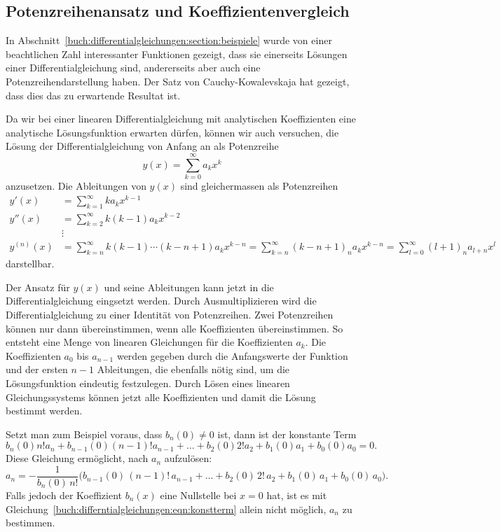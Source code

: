 %
%
\subsection{Potenzreihenansatz und Koeffizientenvergleich}
In Abschnitt~\ref{buch:differentialgleichungen:section:beispiele}
wurde von einer beachtlichen Zahl interessanter Funktionen gezeigt, dass
sie einerseits Lösungen einer Differentialgleichung sind, 
andererseits aber auch eine Potenzreihendarstellung haben.
Der Satz von Cauchy-Kowalevskaja hat gezeigt, dass dies das zu
erwartende Resultat ist.

Da wir bei einer linearen Differentialgleichung mit analytischen
Koeffizienten eine analytische Lösungsfunktion erwarten dürfen,
können wir auch versuchen, die Lösung der Differentialgleichung
von Anfang an als Potenzreihe
\[
y(x)
=
\sum_{k=0}^{\infty} a_kx^k
\]
anzusetzen.
Die Ableitungen von $y(x)$ sind gleichermassen als Potenzreihen
\begin{align*}
y'(x)
&=
\sum_{k=1}^\infty ka_kx^{k-1}
\\
y''(x)
&=
\sum_{k=2}^\infty k(k-1)a_kx^{k-2}
\\
&\vdots\\
y^{(n)}(x)
&=
\sum_{k=n}^\infty
k(k-1)\cdots(k-n+1) a_kx^{k-n}
=
\sum_{k=n}^\infty
(k-n+1)_n a_k x^{k-n}
=
\sum_{l=0}^\infty
(l+1)_na_{l+n}x^l
\end{align*}
darstellbar.

Der Ansatz für $y(x)$ und seine Ableitungen kann jetzt in die
Differentialgleichung eingsetzt werden.
Durch Ausmultiplizieren wird die Differentialgleichung zu
einer Identität von Potenzreihen.
Zwei Potenzreihen können nur dann übereinstimmen, wenn alle
Koeffizienten übereinstimmen.
%
So entsteht eine Menge von linearen Gleichungen für die
Koeffizienten $a_k$.
Die Koeffizienten $a_0$ bis $a_{n-1}$ werden gegeben durch die
Anfangswerte der Funktion und der ersten $n-1$ Ableitungen, die
ebenfalls nötig sind, um die Lösungsfunktion eindeutig festzulegen.
Durch Lösen eines linearen Gleichungssystems können jetzt alle Koeffizienten
und damit die Lösung bestimmt werden.

Setzt man zum Beispiel voraus, dass $b_n(0)\ne 0$ ist, dann ist der
konstante Term
\begin{equation}
b_n(0) n! a_n + b_{n-1}(0) (n-1)! a_{n-1}
+ \dots +
b_2(0) 2! a_2 + b_1(0) a_1 + b_0(0) a_0 = 0.
\label{buch:differntialgleichungen:eqn:konstterm}
\end{equation}
Diese Gleichung ermöglicht, nach $a_n$ aufzulösen:
\[
a_n
=
-
\frac{1}{b_n(0)\,n!}\bigl(
b_{n-1}(0)\,(n-1)!\,a_{n-1} + \dots + 
b_2(0)\,2!\,a_2 + b_1(0)\, a_1 + b_0(0)\, a_0
\bigr).
\]
Falls jedoch der Koeffizient $b_n(x)$ eine Nullstelle bei $x=0$
hat, ist es mit Gleichung~\eqref{buch:differntialgleichungen:eqn:konstterm}
allein nicht möglich, $a_n$ zu bestimmen.

